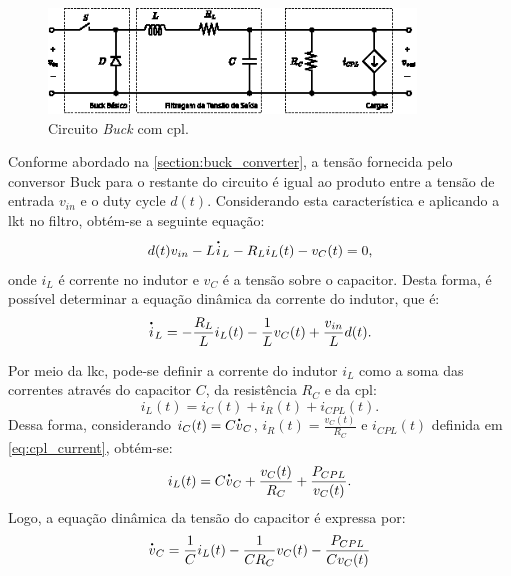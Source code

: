 \begin{figure}[H]
  \centering
  \captionsetup{justification=centering}
  \includegraphics[width=0.87\textwidth]{figuras/buck_converter_circuit.eps}
  \caption{Circuito \textit{Buck} com \acrshort{cpl}.}
  \label{fig:circuit1}
\end{figure}

Conforme abordado na \autoref{section:buck_converter}, a tensão fornecida pelo conversor Buck para o restante do circuito é igual ao produto entre a tensão de entrada $v_{in}$ e o duty cycle $d(t)$. Considerando esta característica e aplicando a \acrfull{lkt} no filtro, obtém-se a seguinte equação: \begin{equation} d(t)v_{in} - L \dt{i}_L - R_L i_L(t) - v_C(t) = 0, \end{equation} onde $i_L$ é corrente no indutor e $v_C$ é a tensão sobre o capacitor. Desta forma, é possível determinar a equação dinâmica da corrente do indutor, que é: \begin{equation} \dt{i}_L = - \frac{R_L}{L} i_L(t) - \frac{1}{L} v_C(t) + \frac{v_{in}}{L}d(t). \label{eq:buck_converter_current} \end{equation}

Por meio da \acrfull{lkc}, pode-se definir a corrente do indutor $i_{L}$ como a soma das correntes através do capacitor $C$, da resistência $R_C$ e da \acrshort{cpl}: \begin{equation} i_L(t) = i_C(t) + i_R(t) + i_{CPL}(t). \end{equation} Dessa forma, considerando $i_C(t) = C\dt{v}_C$, $i_R(t) = \frac{v_C(t)}{R_C}$ e $i_{CPL}(t)$ definida em \eqref{eq:cpl_current}, obtém-se: \begin{equation} i_L(t) = C\dt{v}_C + \frac{v_C(t)}{R_C} + \frac{P_{CPL}}{v_C(t)}. \end{equation} Logo, a equação dinâmica da tensão do capacitor é expressa por: \begin{equation} \dt{v}_C = \frac{1}{C} i_L(t) - \frac{1}{CR_C}v_C(t) - \frac{P_{CPL}}{Cv_C(t)} \label{eq:buck_converter_voltage} \end{equation}


